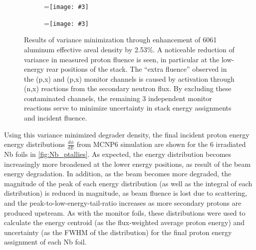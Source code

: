 \documentclass[3p]{elsarticle}
\newcommand{\subfigimg}[3][,]{%
  \setbox1=\hbox{\texttt{[image: \#3]}}%
  \leavevmode\rlap{\usebox1}%
  \rlap{\hspace*{50pt}\raisebox{\dimexpr\ht1-2\baselineskip}{#2}}%
  \phantom{\usebox1}%
}
\begin{document}
\begin{figure}
    \centering
    \begin{subfigure}[t]{0.49\textwidth}
        \centering
        \subfigimg[scale=0.59]{a)}{./figures/before_minimization_plot.pdf}
         \label{fig:before_minimization}
    \end{subfigure}%
     \begin{subfigure}[t]{0.49\textwidth}
        \centering
        \subfigimg[scale=0.59]{b)}{./figures/after_minimization_plot.pdf}
         \label{fig:after_minimization}
    \end{subfigure}%
    \caption{Results of variance minimization through enhancement of 6061 aluminum effective areal density by 2.53\%. A noticeable reduction of variance in measured proton fluence is seen, in particular at the low-energy rear positions of the stack. The \enquote{extra fluence} observed in the  (p,x) and (p,x) monitor channels is caused by activation through (n,x) reactions from the secondary neutron flux. By excluding these contaminated channels, the remaining 3 independent monitor reactions serve to minimize uncertainty in stack energy assignments and incident fluence.}
     \label{fig:variance_mins}
\end{figure}

Using this variance minimized degrader density, the final incident proton energy energy distributions $\frac{d\phi}{dE}$ from MCNP6 simulation are shown for the 6 irradiated Nb foils in \autoref{fig:Nb_ptallies}. 
As expected, the energy distribution becomes increasingly more broadened at the lower energy positions, as result of the beam energy degradation.
In addition, as the beam becomes more degraded, the magnitude of the peak of each energy distribution (as well as the integral of each distribution) is reduced in magnitude, as beam fluence is lost due to scattering, and the peak-to-low-energy-tail-ratio increases as more  secondary protons are produced upstream.
As with the monitor foils, these distributions were used to calculate the  energy centroid  (as the  flux-weighted average proton  energy) and  uncertainty (as the FWHM of the distribution) for the final proton energy assignment of each Nb foil.
\end{document}
